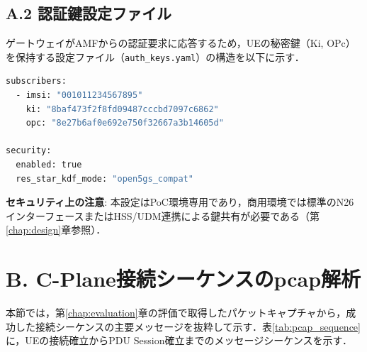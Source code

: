 \subsection*{A.2 認証鍵設定ファイル}

ゲートウェイがAMFからの認証要求に応答するため，UEの秘密鍵（Ki, OPc）を保持する設定ファイル（\texttt{auth\_keys.yaml}）の構造を以下に示す．

\begin{lstlisting}[language=bash,basicstyle=\ttfamily\scriptsize,frame=single,caption={認証鍵設定ファイルの構造（抜粋）}]
subscribers:
  - imsi: "001011234567895"
    ki: "8baf473f2f8fd09487cccbd7097c6862"
    opc: "8e27b6af0e692e750f32667a3b14605d"

security:
  enabled: true
  res_star_kdf_mode: "open5gs_compat"
\end{lstlisting}

\textbf{セキュリティ上の注意}: 本設定はPoC環境専用であり，商用環境では標準のN26インターフェースまたはHSS/UDM連携による鍵共有が必要である（第\ref{chap:design}章参照）．

\section*{B. C-Plane接続シーケンスのpcap解析}

本節では，第\ref{chap:evaluation}章の評価で取得したパケットキャプチャから，成功した接続シーケンスの主要メッセージを抜粋して示す．表\ref{tab:pcap_sequence}に，UEの接続確立からPDU Session確立までのメッセージシーケンスを示す．

